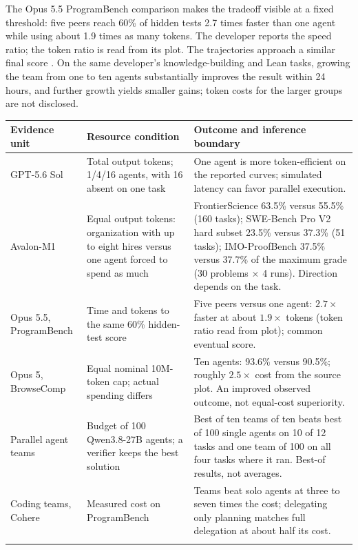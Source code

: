 The Opus 5.5 ProgramBench comparison makes the tradeoff visible at a fixed threshold: five peers reach 60\% of hidden tests 2.7 times faster than one agent while using about 1.9 times as many tokens. The developer reports the speed ratio; the token ratio is read from its plot. The trajectories approach a similar final score \citep{opus55-card}. On the same developer's knowledge-building and Lean tasks, growing the team from one to ten agents substantially improves the result within 24 hours, and further growth yields smaller gains; token costs for the larger groups are not disclosed.

\begin{table}[t]
\centering\small
\begin{tabularx}{\textwidth}{@{}p{}p{}Y@{}}
\toprule
Evidence unit & Resource condition & Outcome and inference boundary\\
\midrule
GPT-5.6 Sol \citep{openai-gpt56-ultra} & Total output tokens; 1/4/16 agents, with 16 absent on one task & One agent is more token-efficient on the reported curves; simulated latency can favor parallel execution.\\\addlinespace[2pt]
Avalon-M1 \citep{avalon-m1} & Equal output tokens: organization with up to eight hires versus one agent forced to spend as much & FrontierScience 63.5\% versus 55.5\% (160 tasks); SWE-Bench Pro V2 hard subset 23.5\% versus 37.3\% (51 tasks); IMO-ProofBench 37.5\% versus 37.7\% of the maximum grade (30 problems $\times$ 4 runs). Direction depends on the task.\\\addlinespace[2pt]
Opus 5.5, ProgramBench \citep{opus55-card} & Time and tokens to the same 60\% hidden-test score & Five peers versus one agent: $2.7\times$ faster at about $1.9\times$ tokens (token ratio read from plot); common eventual score.\\\addlinespace[2pt]
Opus 5, BrowseComp \citep{opus5-card-multiagent} & Equal nominal 10M-token cap; actual spending differs & Ten agents: 93.6\% versus 90.5\%; roughly $2.5\times$ cost from the source plot. An improved observed outcome, not equal-cost superiority.\\\addlinespace[2pt]
Parallel agent teams \citep{parallel-agent-teams} & Budget of 100 Qwen3.8-27B agents; a verifier keeps the best solution & Best of ten teams of ten beats best of 100 single agents on 10 of 12 tasks and one team of 100 on all four tasks where it ran. Best-of results, not averages.\\\addlinespace[2pt]
Coding teams, Cohere \citep{coding-team-compute-allocation} & Measured cost on ProgramBench & Teams beat solo agents at three to seven times the cost; delegating only planning matches full delegation at about half its cost.\\\addlinespace[2pt]

\end{tabularx}
\end{table}
